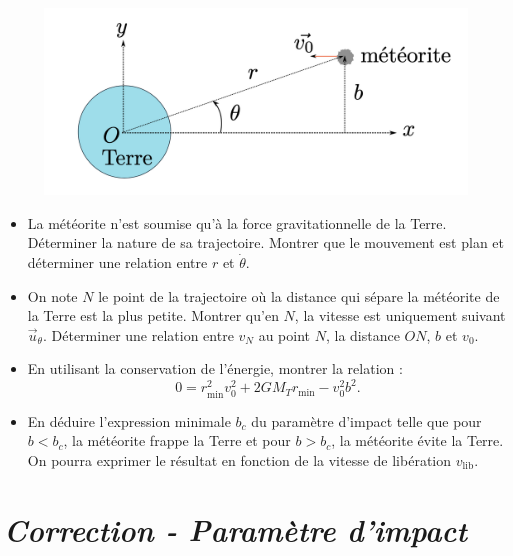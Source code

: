 \documentclass{report}
\begin{document}
\begin{figure}[h]
\centering
  \includegraphics[scale=0.4]{parametre_impact.png}
\end{figure}

\begin{itemize}
\item La météorite n'est soumise qu'à la force gravitationnelle de la Terre. Déterminer la nature de sa trajectoire. Montrer que le mouvement est plan et déterminer une relation entre $r$ et $\dot{\theta}$.
\item On note $N$ le point de la trajectoire où la distance qui sépare la météorite de la Terre est la plus petite. Montrer qu'en $N$, la vitesse est uniquement suivant $\vec{u}_\theta$. Déterminer une relation entre $v_N$ au point $N$, la distance $ON$, $b$ et $v_0$.
\item En utilisant la conservation de l'énergie, montrer la relation :
$$
0=r^2_\mathrm{min}v_0^2+2GM_Tr_\mathrm{min}-v_0^2b^2.
$$
\item En déduire l'expression minimale $b_c$ du paramètre d'impact telle que pour $b<b_c$, la météorite frappe la Terre et pour $b>b_c$, la météorite évite la Terre. On pourra exprimer le résultat en fonction de la vitesse de libération $v_\mathrm{lib}$.
\end{itemize}

\newpage

\section*{\textit{Correction - Paramètre d'impact} }
\end{document}
